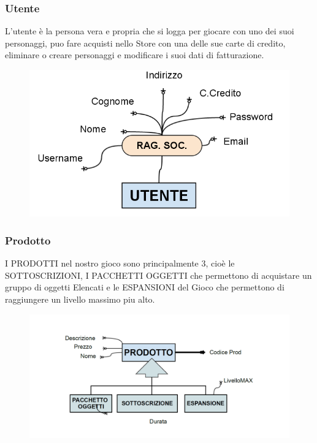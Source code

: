 \subsubsection{Utente} 
L'utente è la persona vera e propria che si logga per giocare con uno dei suoi personaggi, puo fare acquisti nello Store con una delle sue carte di credito, eliminare o creare personaggi e modificare i suoi dati di fatturazione.


\begin{figure}[H]
\centering
\includegraphics[width=0.7\linewidth]{./immagini/untentedef.png}
\end{figure}

\subsubsection{Prodotto} 
I PRODOTTI nel nostro gioco sono principalmente 3, cioè le SOTTOSCRIZIONI, I PACCHETTI OGGETTI che permettono di acquistare un gruppo di oggetti Elencati e le ESPANSIONI del Gioco che permettono di raggiungere un livello massimo piu alto.

\begin{figure}[H]
\centering
\includegraphics[width=0.7\linewidth]{./immagini/prodottodef.png}
\end{figure}

\newpage
